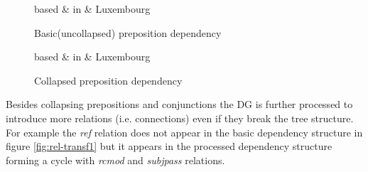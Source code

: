 \begin{figure}
	\centering
	\begin{minipage}[b]{0.45\textwidth}
		\centering
		\begin{dependency}
			\begin{deptext}[]
				based \& in \& Luxembourg\\
			\end{deptext}
		\end{dependency}
		\caption{Basic(uncollapsed) preposition dependency}
		\label{fig:prep-transf1}
	\end{minipage}
	\quad
	\begin{minipage}[b]{0.45\textwidth}
		\centering
		\begin{dependency}
			\begin{deptext}[]
				based \& in \& Luxembourg\\
			\end{deptext}
		\end{dependency}
		\caption{Collapsed preposition dependency}
		\label{fig:prep-transf2}
	\end{minipage}
\end{figure}

Besides collapsing prepositions and conjunctions the DG is further processed to introduce more relations (i.e. connections) even if they break the tree structure. For example the \textit{ref} relation does not appear in the basic dependency structure in figure \ref{fig:rel-transf1} but it appears in the processed dependency structure forming a cycle with \textit{rcmod} and \textit{subjpass} relations.


